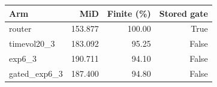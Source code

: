 \begin{tabular}{lrrr}
\toprule
Arm & MiD & Finite (\%) & Stored gate \\
\midrule
router & 153.877 & 100.00 & True \\
timevol20\_3 & 183.092 & 95.25 & False \\
exp6\_3 & 190.711 & 94.10 & False \\
gated\_exp6\_3 & 187.400 & 94.80 & False \\
\bottomrule
\end{tabular}

